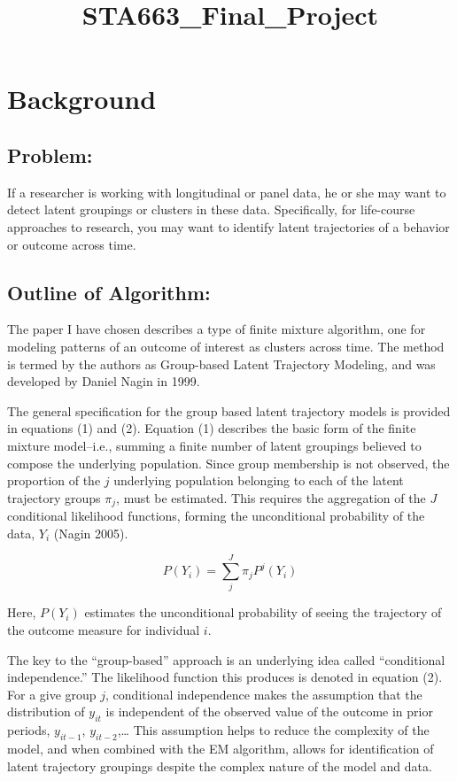 \documentclass{article}
\title{STA663\_Final\_Project}
\begin{document}
    
    
    \maketitle
    
    

    
    \section{Background}\label{background}

    \subsection{Problem:}\label{problem}

If a researcher is working with longitudinal or panel data, he or she
may want to detect latent groupings or clusters in these data.
Specifically, for life-course approaches to research, you may want to
identify latent trajectories of a behavior or outcome across time.

\subsection{Outline of Algorithm:}\label{outline-of-algorithm}

The paper I have chosen describes a type of finite mixture algorithm,
one for modeling patterns of an outcome of interest as clusters across
time. The method is termed by the authors as Group-based Latent
Trajectory Modeling, and was developed by Daniel Nagin in 1999.

The general specification for the group based latent trajectory models
is provided in equations (1) and (2). Equation (1) describes the basic
form of the finite mixture model--i.e., summing a finite number of
latent groupings believed to compose the underlying population. Since
group membership is not observed, the proportion of the \(j\) underlying
population belonging to each of the latent trajectory groups \(\pi_j\),
must be estimated. This requires the aggregation of the \(J\)
conditional likelihood functions, forming the unconditional probability
of the data, \(Y_i\) (Nagin 2005).

\[P(Y_i) = \sum_{j}^J \pi_j P^j (Y_i)\tag{1}\]

Here, \(P(Y_i)\) estimates the unconditional probability of seeing the
trajectory of the outcome measure for individual \(i\).

The key to the ``group-based'' approach is an underlying idea called
``conditional independence.'' The likelihood function this produces is
denoted in equation (2). For a give group \(j\), conditional
independence makes the assumption that the distribution of \(y_{it}\) is
independent of the observed value of the outcome in prior periods,
\(y_{it-1}\), \(y_{it-2}\),\ldots{} This assumption helps to reduce the
complexity of the model, and when combined with the EM algorithm, allows
for identification of latent trajectory groupings despite the complex
nature of the model and data.
\end{document}
